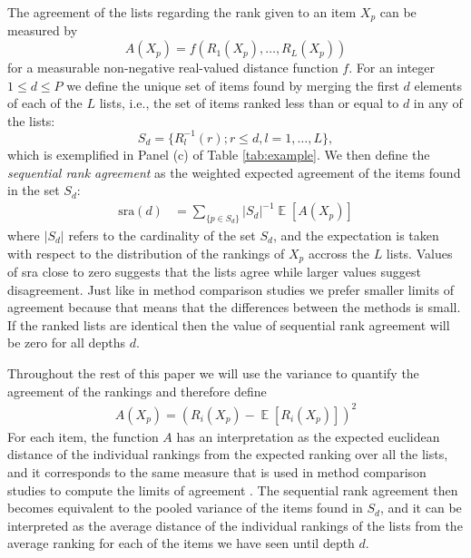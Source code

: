 \documentclass[12pt,a4paper]{article}
\DeclareMathOperator{\E}{\mathbb{E}}
\theoremstyle{plain}
\begin{document}
The agreement of the lists regarding the rank given to an item $X_p$ can be
measured by
\begin{equation}
  A(X_p) = f(R_1(X_p), \ldots, R_L(X_p))
\end{equation}
for a measurable non-negative real-valued distance function $f$.
For an integer $1\le d\le P$ we define the unique set of items found
by merging the first $d$ elements of each of the $L$ lists, i.e., the
set of items ranked less than or equal to $d$ in any of the lists:
\begin{equation}
S_d = \{R_l^{-1}(r) ; r \leq d, l = 1, \ldots, L \},
\end{equation}
which is exemplified in Panel (c) of Table \ref{tab:example}.
We then define the \emph{sequential rank agreement} as the weighted expected agreement of the items
found in the set $S_d$:
\begin{align}
\textrm{sra}(d) &= \sum_{\{p \in S_d\}}|S_d|^{-1} \E[A(X_p)]
\end{align}
where $|S_d|$ refers to the cardinality of the set $S_d$, and the expectation
is taken with respect to the distribution of the rankings of $X_p$ accross the $L$ lists.
Values of \textrm{sra} close to zero suggests that the lists agree while larger
values suggest disagreement. Just like in method comparison studies we
prefer smaller limits of agreement because that means that the
differences between the methods is small. If the ranked lists are
identical then the value of sequential rank agreement will be zero for
all depths $d$.


Throughout the rest of this paper we will use the variance to quantify the
agreement of the rankings and therefore define
\begin{align}
  A(X_p) = (R_i(X_p) -  \E[R_i(X_p)])^2
\end{align}
For each item, the function $A$ has an interpretation as the expected
euclidean distance of the individual rankings from the expected ranking over all the lists, and
it corresponds to the same measure that is used in method comparison studies to compute the
limits of agreement \citep{alt:bland:1983}. The sequential rank agreement then becomes equivalent
to the pooled variance of the items found in $S_d$, and it can be interpreted as
the average distance of the individual rankings of the lists from the
average ranking for each of the items we have seen until depth $d$.
\end{document}
